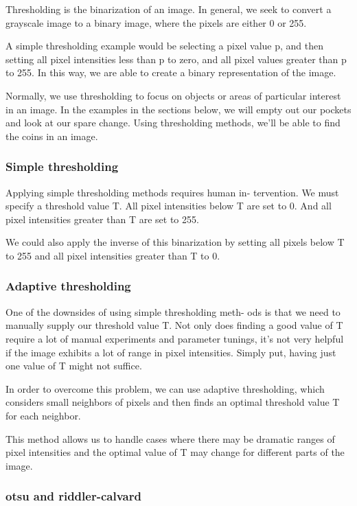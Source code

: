\documentclass[BTech]{srmuthesis}
\begin{document}
Thresholding is the binarization of an image. In general, we seek to convert a grayscale image to a binary image, where the pixels are either 0 or 255.

A simple thresholding example would be selecting a pixel value p, and then setting all pixel intensities less than p to zero, and all pixel values greater than p to 255. In this way, we are able to create a binary representation of the image.

Normally, we use thresholding to focus on objects or areas of particular interest in an image. In the examples in the sections below, we will empty out our pockets and look at our spare change. Using thresholding methods, we’ll be able to find the coins in an image.

\subsubsection{Simple thresholding}

Applying simple thresholding methods requires human in- tervention. We must specify a threshold value T. All pixel intensities below T are set to 0. And all pixel intensities greater than T are set to 255.

We could also apply the inverse of this binarization by setting all pixels below T to 255 and all pixel intensities greater than T to 0.

\subsubsection{Adaptive thresholding}

One of the downsides of using simple thresholding meth- ods is that we need to manually supply our threshold value T. Not only does finding a good value of T require a lot of manual experiments and parameter tunings, it’s not very helpful if the image exhibits a lot of range in pixel intensities.
Simply put, having just one value of T might not suffice.

In order to overcome this problem, we can use adaptive thresholding, which considers small neighbors of pixels and then finds an optimal threshold value T for each neighbor. 

This method allows us to handle cases where there may be dramatic ranges of pixel intensities and the optimal value of T may change for different parts of the image.

\subsubsection{otsu and riddler-calvard}
\end{document}
